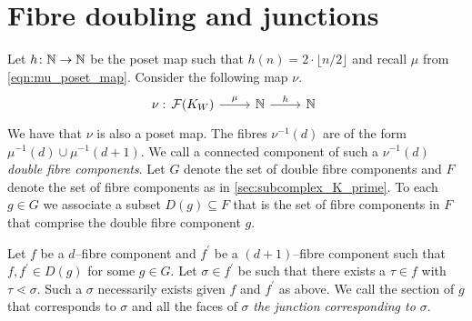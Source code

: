 \documentclass[class=article, crop=false]{standalone}
\begin{document}
\section{Fibre doubling and junctions}

Let $h \colon \mathbb{N} \to \mathbb{N}$ be the poset map such that $h(n) = 2\cdot \lfloor n/2 \rfloor$ and recall $\mu$ from \eqref{eqn:mu_poset_map}. Consider the following map $\nu$.
\begin{equation*}
    \nu \, \colon \!\!\begin{tikzcd}
        \mathcal{F}(K_W) \ar[r, "\mu"] & \N \ar[r, "h"] &\N
    \end{tikzcd}
\end{equation*}
We have that $\nu$ is also a poset map.
The fibres $\nu^{-1}(d)$ are of the form $\mu^{-1}(d) \cup \mu^{-1}(d+1)$. We call a connected component of such a $\nu^{-1}(d)$ \emph{double fibre components}. Let $G$ denote the set of double fibre components and $F$ denote the set of fibre components as in \cref{sec:subcomplex_K_prime}. To each $g \in G$ we associate a subset $D(g) \subseteq F$ that is the set of fibre components in $F$ that comprise the double fibre component $g$.

Let $f$ be a $d$--fibre component and $f^\prime$ be a $(d+1)$--fibre component such that $f, f^\prime \in D(g)$ for some $g \in G$. Let $\sigma \in f^\prime$ be such that there exists a $\tau \in f$ with $\tau \lessdot \sigma$. Such a $\sigma$ necessarily exists given $f$ and $f^\prime$ as above. We call the section of $g$ that corresponds to $\sigma$ and all the faces of $\sigma$ \emph{the junction corresponding to $\sigma$}.
\end{document}

